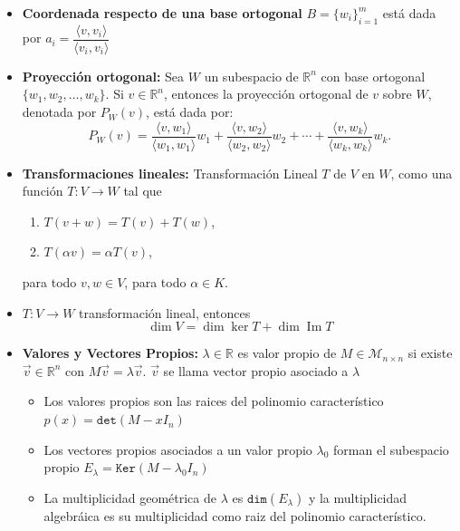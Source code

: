 \documentclass[a4paper]{article}
\theoremstyle{exampstyle}
\theoremstyle{definition}
\begin{document}
\begin{enumerate}
\begin{itemize}
\item \textbf{ Coordenada respecto de una base ortogonal } $B = \{w_i\}_{i=1}^m $ est\'a dada por $a_i=\dfrac{\langle v, v_i \rangle}{\langle v_i, v_i \rangle}$ \item {\bf Proyección ortogonal: } Sea $W$ un subespacio de $\mathbb{R}^n$ con base ortogonal $\{ w_1,w_2, \dots , w_k \}$. Si $v \in \mathbb{R}^n$, entonces la proyección ortogonal de $v$ sobre $W$, denotada por $P_W(v)$, está dada por: $$P_W( v) = \frac{\langle v, w_1 \rangle}{\langle w_1, w_1 \rangle}w_1 + \frac{\langle v, w_2 \rangle}{\langle w_2, w_2 \rangle}w_2 + \cdots + \frac{\langle v, w_k \rangle}{\langle w_k, w_k \rangle}w_k.$$ \item {\bf Transformaciones lineales: } Transformación Lineal $T$ de $ V$ en $W$, como una función $T:V\to W$ tal que \begin{enumerate} \item $T(v+w)=T(v)+T(w)$, \item $T(\alpha v)=\alpha T(v)$, \end{enumerate} para todo $v,w\in V$, para todo $\alpha \in K$. \item $T:V\to W$ transformaci\'on lineal, entonces $$\operatorname{dim}V=\operatorname{dim} \operatorname{ker }T+\operatorname{dim}\operatorname{Im}T$$ \item {\bf Valores y Vectores Propios: } $\lambda \in \mathbb{R}$ es valor propio de $M \in \mathcal{M}_{n \times n}$ si existe $\Vec{v}\in \mathbb{R}^n$ con $M\Vec{v}= \lambda \Vec{v}$. $\Vec{v}$ se llama vector propio asociado a $\lambda$ \begin{itemize} \item Los valores propios son las raices del polinomio característico $p(x)=\texttt{det}(M - x I_n ) $ \item Los vectores propios asociados a un valor propio $ \lambda_0$ forman el subespacio propio $E_{\lambda}=\texttt{Ker}(M-\lambda_0 I_n)$ \item La multiplicidad geométrica de $\lambda$ es $\texttt{dim}(E_\lambda)$ y la multiplicidad algebráica es su multiplicidad como raiz del polinomio característico. \end{itemize} \end{itemize}






\end{enumerate}
\end{document}

